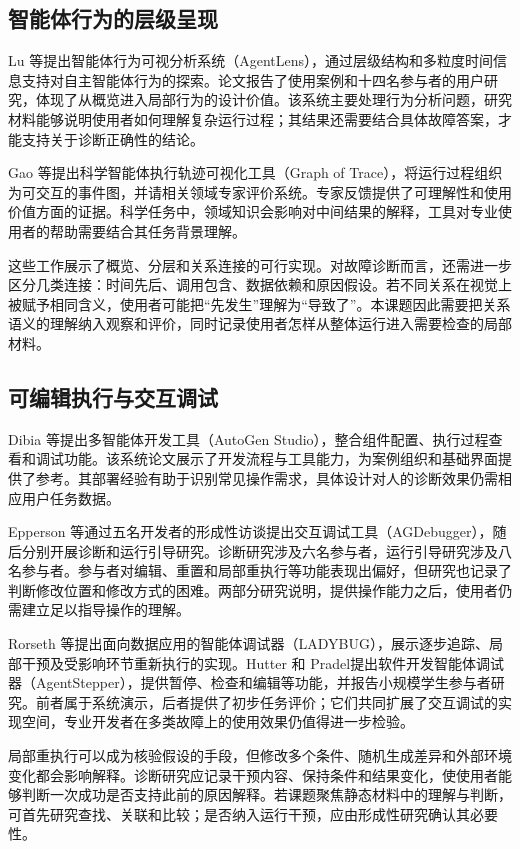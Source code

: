\subsection{智能体行为的层级呈现}

Lu 等\cite{ref22}提出智能体行为可视分析系统（AgentLens），通过层级结构和多粒度时间信息支持对自主智能体行为的探索。论文报告了使用案例和十四名参与者的用户研究，体现了从概览进入局部行为的设计价值。该系统主要处理行为分析问题，研究材料能够说明使用者如何理解复杂运行过程；其结果还需要结合具体故障答案，才能支持关于诊断正确性的结论。

Gao 等\cite{ref24}提出科学智能体执行轨迹可视化工具（Graph of Trace），将运行过程组织为可交互的事件图，并请相关领域专家评价系统。专家反馈提供了可理解性和使用价值方面的证据。科学任务中，领域知识会影响对中间结果的解释，工具对专业使用者的帮助需要结合其任务背景理解。

这些工作展示了概览、分层和关系连接的可行实现。对故障诊断而言，还需进一步区分几类连接：时间先后、调用包含、数据依赖和原因假设。若不同关系在视觉上被赋予相同含义，使用者可能把“先发生”理解为“导致了”。本课题因此需要把关系语义的理解纳入观察和评价，同时记录使用者怎样从整体运行进入需要检查的局部材料。

\subsection{可编辑执行与交互调试}

Dibia 等\cite{ref25}提出多智能体开发工具（AutoGen Studio），整合组件配置、执行过程查看和调试功能。该系统论文展示了开发流程与工具能力，为案例组织和基础界面提供了参考。其部署经验有助于识别常见操作需求，具体设计对人的诊断效果仍需相应用户任务数据。

Epperson 等\cite{ref02}通过五名开发者的形成性访谈提出交互调试工具（AGDebugger），随后分别开展诊断和运行引导研究。诊断研究涉及六名参与者，运行引导研究涉及八名参与者。参与者对编辑、重置和局部重执行等功能表现出偏好，但研究也记录了判断修改位置和修改方式的困难。两部分研究说明，提供操作能力之后，使用者仍需建立足以指导操作的理解。

Rorseth 等\cite{ref28}提出面向数据应用的智能体调试器（LADYBUG），展示逐步追踪、局部干预及受影响环节重新执行的实现。Hutter 和 Pradel\cite{ref18}提出软件开发智能体调试器（AgentStepper），提供暂停、检查和编辑等功能，并报告小规模学生参与者研究。前者属于系统演示，后者提供了初步任务评价；它们共同扩展了交互调试的实现空间，专业开发者在多类故障上的使用效果仍值得进一步检验。

局部重执行可以成为核验假设的手段，但修改多个条件、随机生成差异和外部环境变化都会影响解释。诊断研究应记录干预内容、保持条件和结果变化，使使用者能够判断一次成功是否支持此前的原因解释。若课题聚焦静态材料中的理解与判断，可首先研究查找、关联和比较；是否纳入运行干预，应由形成性研究确认其必要性。

